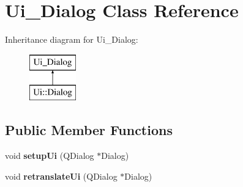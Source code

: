 \hypertarget{class_ui___dialog}{}\section{Ui\+\_\+\+Dialog Class Reference}
\label{class_ui___dialog}
Inheritance diagram for Ui\+\_\+\+Dialog\+:\begin{figure}[H]
\begin{center}
\leavevmode
\includegraphics[height=2.000000cm]{class_ui___dialog}
\end{center}
\end{figure}
\subsection*{Public Member Functions}
\begin{DoxyCompactItemize}
\item 
\mbox{\label{class_ui___dialog_a4f6a478c3ecdafabffb17b39cb26444a}} 
void {\bfseries setup\+Ui} (Q\+Dialog $\ast$Dialog)
\item 
\mbox{\label{class_ui___dialog_afa0ccb6f716ca6178260522a193c250e}} 
void {\bfseries retranslate\+Ui} (Q\+Dialog $\ast$Dialog)
\end{DoxyCompactItemize}
